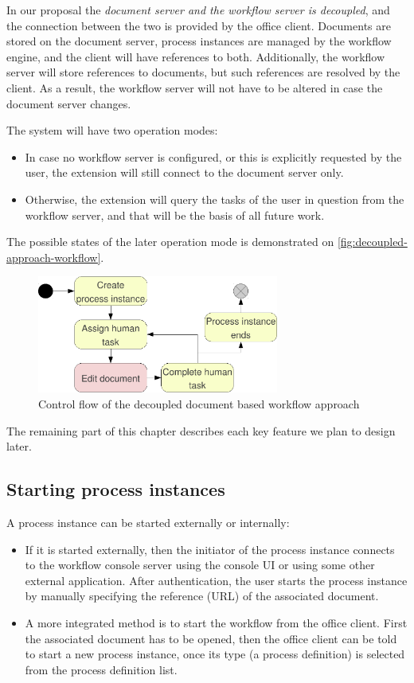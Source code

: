 In our proposal the \emph{document server and the workflow server is
decoupled}, and the connection between the two is provided by the office
client. Documents are stored on the document server, process instances are
managed by the workflow engine, and the client will have references to both.
Additionally, the workflow server will store references to documents, but such
references are resolved by the client. As a result, the workflow server will
not have to be altered in case the document server changes.

The system will have two operation modes:

\begin{itemize}
\item In case no workflow server is configured, or this is explicitly requested
by the user, the extension will still connect to the document server only.
\item Otherwise, the extension will query the tasks of the user in question
from the workflow server, and that will be the basis of all future work.
\end{itemize}

The possible states of the later operation mode is demonstrated on
\autoref{fig:decoupled-approach-workflow}.

\begin{figure}[H]
\centering
\includegraphics[width=300px,keepaspectratio]{decoupled-approach-workflow.pdf}
\caption{Control flow of the decoupled document based workflow approach}
\label{fig:decoupled-approach-workflow}
\end{figure}

The remaining part of this chapter describes each key feature we plan to design
later.

\subsection*{Starting process instances}

A process instance can be started externally or internally:

\begin{itemize}
\item If it is started externally, then the initiator of the process instance
connects to the workflow console server using the console UI or using some
other external application. After authentication, the user starts the process
instance by manually specifying the reference (URL) of the associated document.
\item A more integrated method is to start the workflow from the office client.
First the associated document has to be opened, then the office client can be
told to start a new process instance, once its type (a process definition) is
selected from the process definition list.
\end{itemize}

